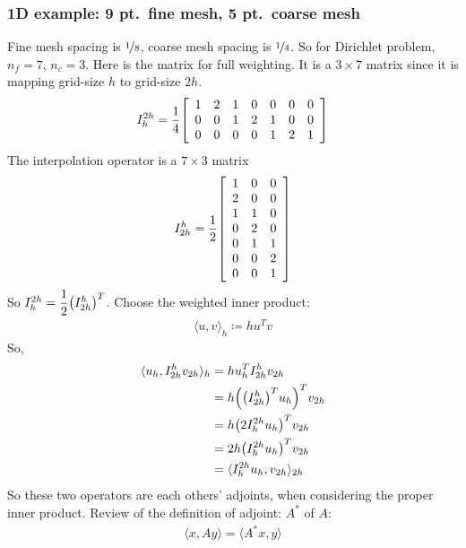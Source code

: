 \documentclass{article}
\begin{document}
            \subsubsection{1D example: 9 pt.~fine mesh, 5 pt.~coarse mesh}
                Fine mesh spacing is $\nicefrac{1}{8}$, coarse mesh spacing is $\nicefrac{1}{4}$.  So for Dirichlet problem, $n_f = 7$, $n_c = 3$.  Here is the matrix for full weighting.  It is a $3\times7$ matrix since it is mapping grid-size $h$ to grid-size $2h$.
                \begin{align*}
                    I_h^{2h} = \frac{1}{4}\qty[\begin{array}{ccccccc}
                        1 & 2 & 1 & 0 & 0 & 0 & 0 \\
                        0 & 0 & 1 & 2 & 1 & 0 & 0 \\
                        0 & 0 & 0 & 0 & 1 & 2 & 1
                    \end{array}]
                \end{align*}
                The interpolation operator is a $7\times3$ matrix
                \begin{align*}
                    I_{2h}^h = \frac{1}{2}\qty[\begin{array}{ccc}
                        1 & 0 & 0 \\
                        2 & 0 & 0 \\
                        1 & 1 & 0 \\
                        0 & 2 & 0 \\
                        0 & 1 & 1 \\
                        0 & 0 & 2 \\
                        0 & 0 & 1
                    \end{array}]
                \end{align*}
                So $I_h^{2h} = \dfrac{1}{2}\qty(I_{2h}^h)^T$.  Choose the weighted inner product:
                \begin{align*}
                    \langle u,v\rangle_h \coloneqq h u^T v
                \end{align*}
                So,
                \begin{align*}
                    \langle u_h, I_{2h}^hv_{2h}\rangle_h &= hu_h^TI_{2h}^hv_{2h} \\ 
                    &= h \qty(\qty(I_{2h}^h)^Tu_h)^Tv_{2h} \\
                    &= h \qty(2I_h^{2h}u_h)^Tv_{2h} \\
                    &= 2h \qty(I_h^{2h}u_h)^T v_{2h} \\
                    &= \langle I_h^{2h}u_h, v_{2h} \rangle_{2h}
                \end{align*}
                So these two operators are each others' adjoints, when considering the proper inner product.  Review of the definition of adjoint: $A^*$ of $A$:
                \begin{align*}
                    \langle x, Ay \rangle = \langle A^*x, y \rangle
                \end{align*}
\end{document}
